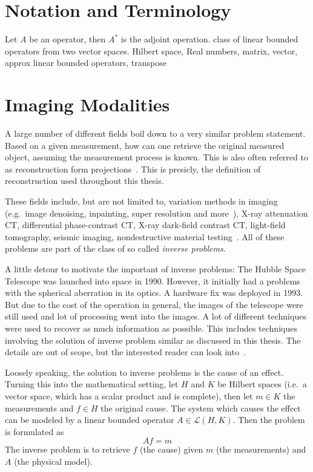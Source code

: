 \chapter{Notation and Terminology}\label{chap:notation}

Let \(A\) be an operator, then \(A^\ast\) is the adjoint operation. class of linear bounded
operators from two vector spaces.
Hilbert space, Real numbers, matrix, vector, approx linear bounded operators, transpose

\chapter{Imaging Modalities}\label{chap:imaging_modalities}

A large number of different fields boil down to a very similar problem statement. Based on a given
measurement, how can one retrieve the original measured object, assuming the measurement process is
known. This is also often referred to as reconstruction form projections~\cite{herman_basis_2015}.
This is presicly, the definition of reconstruction used throughout this thesis.

These fields include, but are not limited to, variation methods in imaging (e.g.\ image denoising,
inpainting, super resolution and more~\cite{scherzer_variational_2009}), X-ray attenuation CT,
differential phase-contrast CT, X-ray dark-field contrast CT, light-field tomography, seismic
imaging, nondestructive material testing~\cite{carpio_inverse_2008}. All of these problems are part
of the class of so called \textit{inverse problems}.

A little detour to motivate the important of inverse problems: The Hubble Space Telescope was
launched into space in 1990. However, it initially had a problems with the spherical aberration in
its optics. A hardware fix was deployed in 1993. But due to the cost of the operation in general,
the images of the telescope were still used and lot of processing went into the images. A lot of
different techniques were used to recover as much information as possible. This includes techniques
involving the solution of inverse problem similar as discussed in this thesis. The details are out
of scope, but the interested reader can look into~\cite{white_restoration_1992,adorf_hubble_1995}.

\begin{definition}\label{def:inverse_problem}
	Loosely speaking, the solution to inverse problems is the cause of an effect. Turning this
	into the mathematical setting, let \(H\) and \(K\) be Hilbert spaces (i.e.\ a vector space,
	which has a scalar product and is complete), then let \(m \in K\) the measurements and \(f
	\in H\) the original cause. The system which causes the effect can be modeled by a
	linear bounded operator \(A \in \mathscr{L}(H, K)\). Then the problem is formulated as
	\[ A f = m \]
	The inverse problem is to retrieve \(f\) (the cause) given \(m\) (the measurements) and \(A\)
	(the physical model).
\end{definition}

